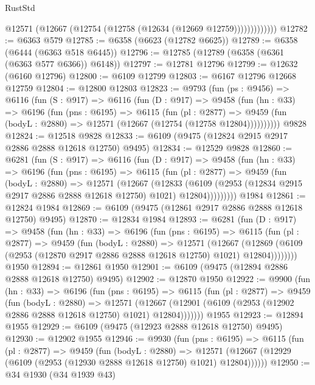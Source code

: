 \begin{lexlean}{RustStd}
\begin{coremodule}
                  @12571 (@12667 (@12754 (@12758 (@12634 (@12669 @12759)))))))))))))
@12782 := @6363 @579
@12785 := @6358 (@6623 (@12782 @6625))
@12789 := @6358 (@6444 (@6363 @518 @6445))
@12796 := @12785 (@12789 (@6358 (@6361 (@6363 @577 @6366)) @6148))
@12797 := @12781 @12796
@12799 := @12632 (@6160 @12796)
@12800 := @6109 @12799
@12803 := @6167 @12796 @12668 @12759
@12804 := @12800 @12803
@12823 := @9793
    (fun (ps : @9456) =>
    @6116
      (fun (S : @917) =>
      @6116
        (fun (D : @917) =>
        @9458
          (fun (hn : @33) =>
          @6196
            (fun (pns : @6195) =>
            @6115
              (fun (pl : @2877) =>
              @9459 (fun (bodyL : @2880) => @12571 (@12667 (@12754 (@12758 @12804))))))))))
    @9828
@12824 := @12518 @9828
@12833 := @6109 (@9475 (@12824 @2915 @2917 @2886 @2888 @12618 @12750) @9495)
@12834 := @12529 @9828
@12860 := @6281
    (fun (S : @917) =>
    @6116
      (fun (D : @917) =>
      @9458
        (fun (hn : @33) =>
        @6196
          (fun (pns : @6195) =>
          @6115
            (fun (pl : @2877) =>
            @9459
              (fun (bodyL : @2880) =>
              @12571
                (@12667
                  (@12833
                    (@6109
                      (@2953 (@12834 @2915 @2917 @2886 @2888 @12618 @12750) @1021)
                      @12804)))))))))
    @1984
@12861 := @12824 @1984
@12869 := @6109 (@9475 (@12861 @2917 @2886 @2888 @12618 @12750) @9495)
@12870 := @12834 @1984
@12893 := @6281
    (fun (D : @917) =>
    @9458
      (fun (hn : @33) =>
      @6196
        (fun (pns : @6195) =>
        @6115
          (fun (pl : @2877) =>
          @9459
            (fun (bodyL : @2880) =>
            @12571
              (@12667
                (@12869 (@6109 (@2953 (@12870 @2917 @2886 @2888 @12618 @12750) @1021) @12804))))))))
    @1950
@12894 := @12861 @1950
@12901 := @6109 (@9475 (@12894 @2886 @2888 @12618 @12750) @9495)
@12902 := @12870 @1950
@12922 := @9900
    (fun (hn : @33) =>
    @6196
      (fun (pns : @6195) =>
      @6115
        (fun (pl : @2877) =>
        @9459
          (fun (bodyL : @2880) =>
          @12571
            (@12667 (@12901 (@6109 (@2953 (@12902 @2886 @2888 @12618 @12750) @1021) @12804)))))))
    @1955
@12923 := @12894 @1955
@12929 := @6109 (@9475 (@12923 @2888 @12618 @12750) @9495)
@12930 := @12902 @1955
@12946 := @9930
    (fun (pns : @6195) =>
    @6115
      (fun (pl : @2877) =>
      @9459
        (fun (bodyL : @2880) =>
        @12571 (@12667 (@12929 (@6109 (@2953 (@12930 @2888 @12618 @12750) @1021) @12804))))))
@12950 := @34 @1930 (@34 @1939 @43)

\end{coremodule}
\end{lexlean}
